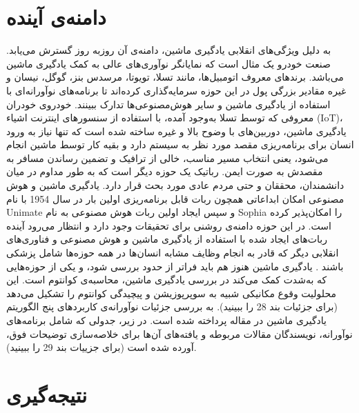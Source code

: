 \documentclass{CSICC2020}
\begin{document}
\section{دامنه‌ی آینده }
به دلیل ویژگی‌های انقلابی یادگیری ماشین، دامنه‌ی آن روزبه روز گسترش می‌یابد. صنعت خودرو یک مثال است که نمایانگر نوآوری‌های عالی به کمک یادگیری ماشین می‌باشد. برندهای معروف اتومبیل‌ها، مانند تسلا، تویوتا، مرسدس بنز، گوگل، نیسان و غیره مقادیر بزرگی پول در این حوزه سرمایه‌گذاری کرده‌اند تا برنامه‌های نوآورانه‌ای با استفاده از یادگیری ماشین و سایر هوش‌مصنوعی‌ها تدارک ببینند. خودروی خودران معروفی که توسط تسلا به‌وجود آمده، با استفاده از سنسورهای اینترنت اشیاء (IoT)، یادگیری ماشین، دوربین‌های با وضوح بالا و غیره ساخته شده است که تنها نیاز به ورود انسان برای برنامه‌ریزی مقصد مورد نظر به سیستم دارد و بقیه کار توسط ماشین انجام می‌شود، یعنی انتخاب مسیر مناسب، خالی از ترافیک و تضمین رساندن مسافر به مقصدش به صورت ایمن. رباتیک یک حوزه دیگر است که به طور مداوم در میان دانشمندان، محققان و حتی مردم عادی مورد بحث قرار دارد. یادگیری ماشین و هوش مصنوعی امکان ابداعاتی همچون ربات قابل برنامه‌ریزی اولین بار در سال 1954 با نام Unimate و سپس ایجاد اولین ربات هوش مصنوعی به نام Sophia را امکان‌پذیر کرده است. در این حوزه دامنه‌ی روشنی برای تحقیقات وجود دارد و انتظار می‌رود آینده ربات‌های ایجاد شده با استفاده از یادگیری ماشین و هوش مصنوعی و فناوری‌های انقلابی دیگر که قادر به انجام وظایف مشابه انسان‌ها در همه حوزه‌ها شامل پزشکی باشند . یادگیری ماشین هنوز هم باید فراتر از حدود بررسی شود، و یکی از حوزه‌هایی که به‌شدت کمک می‌کند در بررسی یادگیری ماشین، محاسبه‌ی کوانتوم است. این محلولیت وقوع مکانیکی شبیه به سوپرپوزیشن و پیچیدگی کوانتوم را تشکیل می‌دهد  (برای جزئیات بند 28 را ببینید). 
به بررسی جزئیات نوآورانه‌ی کاربردهای پنج الگوریتم یادگیری ماشین در مقاله پرداخته شده است. در زیر، جدولی که شامل برنامه‌های نوآورانه، نویسندگان مقالات مربوطه و یافته‌های آن‌ها برای خلاصه‌سازی توضیحات فوق، آورده شده است (برای جزییات بند 29 را ببینید). 
\section{نتیجه‌گیری}
\end{document}
